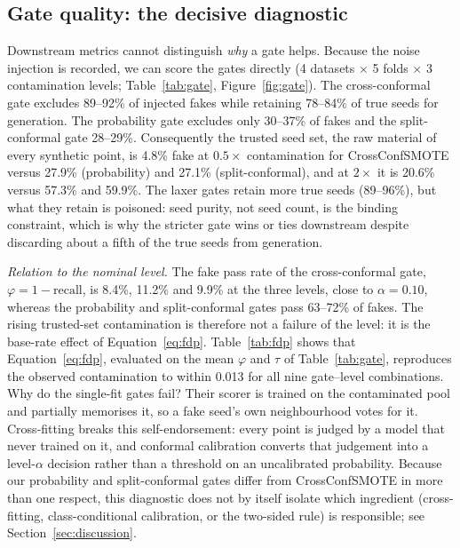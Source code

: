 \documentclass[10pt]{article} %
\begin{document}
\subsection{Gate quality: the decisive diagnostic}
\label{sec:gate}

Downstream metrics cannot distinguish \emph{why} a gate helps. Because the noise injection is recorded, we can score the gates directly (4 datasets $\times$ 5 folds $\times$ 3 contamination levels; Table~\ref{tab:gate}, Figure~\ref{fig:gate}). The cross-conformal gate excludes 89--92\% of injected fakes while retaining 78--84\% of true seeds for generation. The probability gate excludes only 30--37\% of fakes and the split-conformal gate 28--29\%. Consequently the trusted seed set, the raw material of every synthetic point, is 4.8\% fake at $0.5\times$ contamination for CrossConfSMOTE versus 27.9\% (probability) and 27.1\% (split-conformal), and at $2\times$ it is 20.6\% versus 57.3\% and 59.9\%. The laxer gates retain more true seeds (89--96\%), but what they retain is poisoned: seed purity, not seed count, is the binding constraint, which is why the stricter gate wins or ties downstream despite discarding about a fifth of the true seeds from generation.

\emph{Relation to the nominal level.} The fake pass rate of the cross-conformal gate, $\varphi = 1 - \mathrm{recall}$, is 8.4\%, 11.2\% and 9.9\% at the three levels, close to $\alpha = 0.10$, whereas the probability and split-conformal gates pass 63--72\% of fakes. The rising trusted-set contamination is therefore not a failure of the level: it is the base-rate effect of Equation~\ref{eq:fdp}. Table~\ref{tab:fdp} shows that Equation~\ref{eq:fdp}, evaluated on the mean $\varphi$ and $\tau$ of Table~\ref{tab:gate}, reproduces the observed contamination to within 0.013 for all nine gate--level combinations. Why do the single-fit gates fail? Their scorer is trained on the contaminated pool and partially memorises it, so a fake seed's own neighbourhood votes for it. Cross-fitting breaks this self-endorsement: every point is judged by a model that never trained on it, and conformal calibration converts that judgement into a level-$\alpha$ decision rather than a threshold on an uncalibrated probability. Because our probability and split-conformal gates differ from CrossConfSMOTE in more than one respect, this diagnostic does not by itself isolate which ingredient (cross-fitting, class-conditional calibration, or the two-sided rule) is responsible; see Section~\ref{sec:discussion}.
\end{document}
